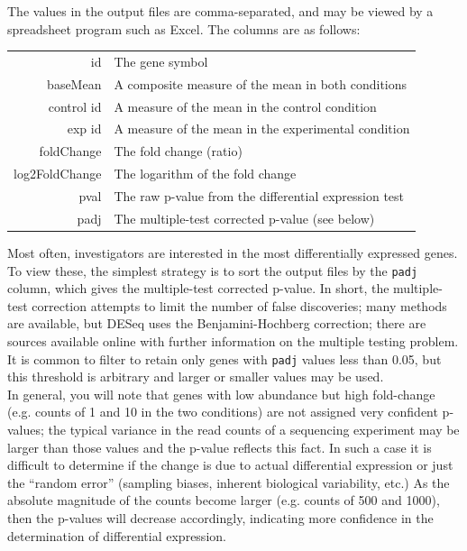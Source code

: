 \documentclass{article}
\begin{document}
{{{The values in the output files are comma-separated, and may be viewed by a spreadsheet program such as Excel.  The columns are as follows:
\begin{center}
\begin{tabular}{r|l}
id & The gene symbol \\
baseMean & A composite measure of the mean in both conditions  \\
\textlangle{}control id\textrangle{} & A measure of the mean in the control condition \\
\textlangle{}exp id\textrangle{} & A measure of the mean in the experimental condition \\
foldChange & The fold change (ratio)\\
log2FoldChange & The logarithm of the fold change \\
pval & The raw p-value from the differential expression test \\
padj & The multiple-test corrected p-value (see below)
\end{tabular}
\end{center}

Most often, investigators are interested in the most differentially expressed genes.  To view these, the simplest strategy is to sort the output files by the \verb|padj| column, which gives the multiple-test corrected p-value.  In short, the multiple-test correction attempts to limit the number of false discoveries; many methods are available, but DESeq uses the Benjamini-Hochberg correction; there are sources available online with further information on the multiple testing problem.  It is common to filter to retain only genes with \verb|padj| values less than 0.05, but this threshold is arbitrary and larger or smaller values may be used.\\

In general, you will note that genes with low abundance but high fold-change (e.g. counts of 1 and 10 in the two conditions) are not assigned very confident p-values; the typical variance in the read counts of a sequencing experiment may be larger than those values and the p-value reflects this fact.  In such a case it is difficult to determine if the change is due to actual differential expression or just the ``random error'' (sampling biases, inherent biological variability, etc.)  As the absolute magnitude of the counts become larger (e.g. counts of 500 and 1000), then the p-values will decrease accordingly, indicating more confidence in the determination of differential expression.  \\

}}}
\end{document}
